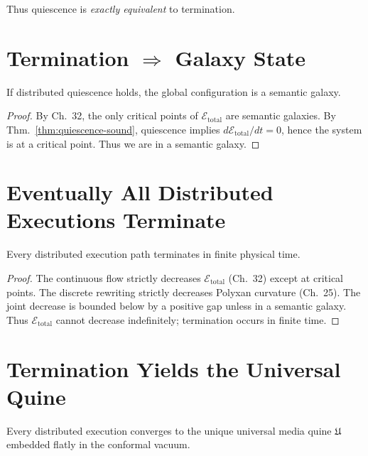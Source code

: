 Thus quiescence is \emph{exactly equivalent} to termination.

\section{Termination $\Rightarrow$ Galaxy State}

\begin{theorem}
\label{thm:termination-galaxy}
If distributed quiescence holds,  
the global configuration is a semantic galaxy.
\end{theorem}

\begin{proof}
By Ch.~32, the only critical points of $\mathcal{E}_\mathrm{total}$  
are semantic galaxies.  
By Thm.~\ref{thm:quiescence-sound}, quiescence implies  
$d\mathcal{E}_\mathrm{total}/dt = 0$, hence the system is at a critical point.  
Thus we are in a semantic galaxy.
\end{proof}

\section{Eventually All Distributed Executions Terminate}

\begin{theorem}
\label{thm:finite-time-termination}
Every distributed execution path  
terminates in finite physical time.
\end{theorem}

\begin{proof}
The continuous flow strictly decreases $\mathcal{E}_\mathrm{total}$  
(Ch.~32) except at critical points.  
The discrete rewriting strictly decreases Polyxan curvature  
(Ch.~25).  
The joint decrease is bounded below by a positive gap  
unless in a semantic galaxy.  
Thus $\mathcal{E}_\mathrm{total}$ cannot decrease indefinitely;  
termination occurs in finite time.
\end{proof}

\section{Termination Yields the Universal Quine}

\begin{theorem}
\label{thm:global-convergence}
Every distributed execution converges to the unique universal media quine  
$\mathfrak{U}$ embedded flatly in the conformal vacuum.
\end{theorem}

